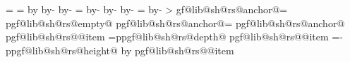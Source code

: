 {{					\pgfutil@tempdima=\pgf@ya%
				\fi%
				\ifdim\pgf@yb>\pgfutil@tempdimb%
					\pgfutil@tempdimb=\pgf@yb%
				\fi%
				\pgf@yc=\pgfutil@tempdima%
				\advance\pgf@yc by\pgfutil@tempdimb%
				\ifdim\pgf@yc>\pgf@y%
					\pgf@y=\pgf@yc%
				\fi%
		\repeatpgfmathloop%
		\edef\pgf@lib@sh@rs@max@width{\the\pgf@x}%
		\edef\pgf@lib@sh@rs@max@totalheight{\the\pgf@y}%
		\pgfmathsetlength{}%
		\advance\pgf@x by-\innerxsep\relax%
		\advance\pgf@x by-\innerxsep\relax%
		\pgf@xa=\pgf@x%
		\advance\pgf@xa by-\pgf@lib@sh@rs@max@width\relax%
		\ifdim\pgf@xa>0pt\relax%
			\edef\pgf@lib@sh@rs@max@width{\the\pgf@x}%
		\fi%
		\pgfmathsetlength{}%
		\advance\pgf@y by-\innerysep\relax%
		\advance\pgf@y by-\innerysep\relax%
		\pgf@ya=\pgf@y%
		\advance\pgf@ya by-\pgf@lib@sh@rs@max@totalheight\relax%
		\ifdim\pgf@ya>0pt\relax%
			\edef\pgf@lib@sh@rs@max@totalheight{\the\pgf@y}%
		\fi%
		\ifpgfrectanglesplithorizontal%
			\pgf@x=0pt\relax%
			\pgfmathloop%
				\ifnum\pgfmathcounter>\parts%
				\else%
					\pgf@lib@sh@getalpha\pgf@lib@sh@rs@number{\pgfmathcounter}%
					\expandafter\let\csname pgf@lib@sh@rs@anchor@\pgf@lib@sh@rs@number\endcsname=\pgfutil@empty%
					\expandafter\ifx\csname pgf@lib@sh@rs@empty@\pgf@lib@sh@rs@number\endcsname\pgfutil@empty%
						\ifpgfrectanglesplitignoreemptyparts%
							\expandafter\let\csname pgf@lib@sh@rs@anchor@\pgf@lib@sh@rs@number\endcsname=%
								\pgf@lib@sh@rs@lastanchor%
						\fi%
					\fi%
					\expandafter\ifx\csname pgf@lib@sh@rs@anchor@\pgf@lib@sh@rs@number\endcsname\pgfutil@empty%
						\expandafter\ifx\csname pgf@lib@sh@rs@\pgf@lib@sh@rs@number @item\endcsname%
								\pgf@lib@sh@rs@bottomtext%
							\pgf@y=\csname pgf@lib@sh@rs@depth@\pgf@lib@sh@rs@number\endcsname\relax%
						\else%
							\expandafter\ifx\csname pgf@lib@sh@rs@\pgf@lib@sh@rs@number @item\endcsname%
									\pgf@lib@sh@rs@toptext%
								\pgf@y=-\csname pgf@lib@sh@rs@height@\pgf@lib@sh@rs@number\endcsname\relax%
								\advance\pgf@y by\pgf@lib@sh@rs@max@totalheight\relax%
							\else%
								\expandafter\ifx\csname pgf@lib@sh@rs@\pgf@lib@sh@rs@number @item\endcsname%
										\pgf@lib@sh@rs@basetext%
}}
